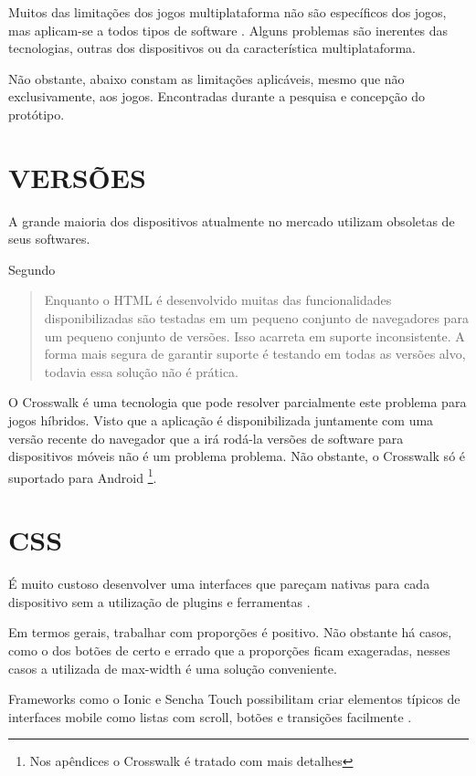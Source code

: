 \begin{draft}

Muitos das limitações dos jogos multiplataforma não são
específicos dos jogos, mas aplicam-se a todos tipos de software
\parencite{currentStateCrossPlatform}. Alguns problemas são inerentes
das tecnologias, outras dos dispositivos ou da característica
multiplataforma.

Não obstante, abaixo constam as limitações aplicáveis, mesmo
que não exclusivamente, aos jogos. Encontradas durante a pesquisa e
concepção do protótipo.

\section{VERSÕES}

A grande maioria dos dispositivos atualmente no mercado utilizam
obsoletas de seus softwares.

Segundo \cite{crossPlatformMobileGame}
\begin{quote}
Enquanto o HTML é desenvolvido muitas das funcionalidades
disponibilizadas são testadas em um pequeno conjunto de
navegadores para um pequeno conjunto de versões. Isso
acarreta em suporte inconsistente. A forma mais segura de garantir
suporte é testando em todas as versões alvo, todavia essa solução
não é prática.
\end{quote}

O Crosswalk é uma tecnologia que pode resolver parcialmente
este problema para jogos híbridos. Visto que a aplicação é
disponibilizada juntamente com uma versão recente do navegador que a
irá rodá-la versões de software para dispositivos móveis não é
um problema problema. Não obstante, o Crosswalk só é suportado para
Android \footnote{Nos apêndices o Crosswalk é tratado com mais detalhes}.

\section{CSS}

É muito custoso desenvolver uma interfaces que pareçam nativas
para cada dispositivo sem a utilização de plugins e ferramentas
. 

Em termos gerais, trabalhar com proporções é positivo. Não obstante
há casos, como o dos botões de certo e errado que a proporções ficam
exageradas, nesses casos a utilizada de max-width é uma solução
conveniente.

Frameworks como o Ionic e Sencha Touch  possibilitam criar elementos 
típicos de interfaces mobile como listas com scroll, botões e transições
facilmente \autocite{publishHtml5}.


\end{draft}

